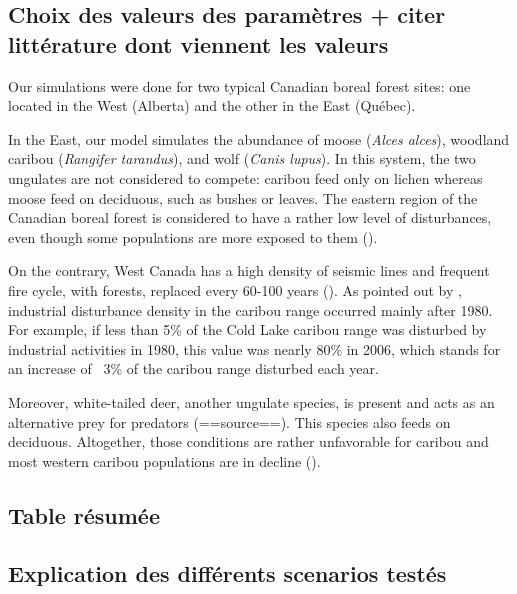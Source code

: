 \subsection{Choix des valeurs des paramètres + citer littérature dont viennent les valeurs}
Our simulations were done for two typical Canadian boreal forest sites: one located in the West (Alberta) and the other in the East (Québec). 

In the East, our model simulates the abundance of moose (\textit{Alces alces}), woodland caribou (\textit{Rangifer tarandus}), and wolf (\textit{Canis lupus}). In this system, the two ungulates are not considered to compete: caribou feed only on lichen whereas moose feed on deciduous, such as bushes or leaves. The eastern region of the Canadian boreal forest is considered to have a rather low level of disturbances, even though some populations are more exposed to them (\cite{johnson2019}).

On the contrary, West Canada has a high density of seismic lines and frequent fire cycle, with forests, replaced every 60-100 years (\cite{johnson2019, stewart2020}). As pointed out by \cite{stewart2020}, industrial disturbance density in the caribou range occurred mainly after 1980. For example, if less than 5\% of the Cold Lake caribou range was disturbed by industrial activities in 1980, this value was nearly 80\% in 2006, which stands for an increase of ~3\% of the caribou range disturbed each year.

Moreover, white-tailed deer, another ungulate species, is present and acts as an alternative prey for predators (==source==). This species also feeds on deciduous. Altogether, those conditions are rather unfavorable for caribou and most western caribou populations are in decline (\cite{stewart2020}).


\subsection{Table résumée}


\subsection{Explication des différents scenarios testés}


